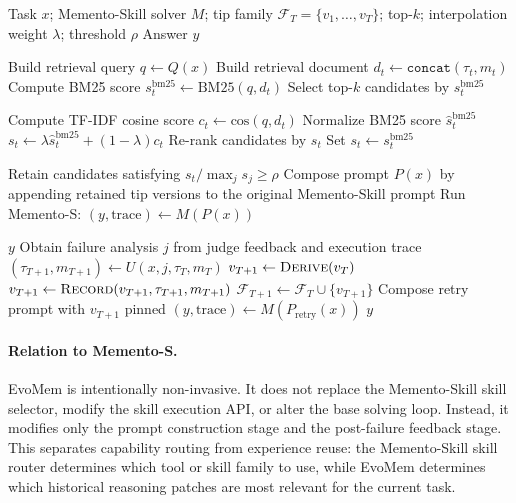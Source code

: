 \documentclass{article}
\begin{document}
\begin{algorithm}[H]
\caption{EvoMem: Versioned Tip Patching on Top of Memento-S}
\label{alg:evomem_memento}
\begin{algorithmic}[1]
\Require Task $x$; Memento-Skill solver $M$; tip family $\mathcal{F}_T=\{v_1,\ldots,v_T\}$; top-$k$; interpolation weight $\lambda$; threshold $\rho$
\Ensure Answer $y$

\State Build retrieval query $q \leftarrow Q(x)$
    \State Build retrieval document $d_t \leftarrow \texttt{concat}(\tau_t,m_t)$
    \State Compute BM25 score $s_t^{\mathrm{bm25}} \leftarrow \mathrm{BM25}(q,d_t)$
\EndFor
\State Select top-$k$ candidates by $s_t^{\mathrm{bm25}}$

        \State Compute TF-IDF cosine score $c_t \leftarrow \mathrm{cos}(q,d_t)$
        \State Normalize BM25 score $\hat{s}_t^{\mathrm{bm25}}$
        \State $s_t \leftarrow \lambda \hat{s}_t^{\mathrm{bm25}} + (1-\lambda)c_t$
    \EndFor
    \State Re-rank candidates by $s_t$
\Else
    \State Set $s_t \leftarrow s_t^{\mathrm{bm25}}$
\EndIf

\State Retain candidates satisfying $s_t/\max_j s_j \ge \rho$
\State Compose prompt $P(x)$ by appending retained tip versions to the original Memento-Skill prompt
\State Run Memento-S: $(y,\mathrm{trace}) \leftarrow M(P(x))$

    \State \Return $y$
\Else
    \State Obtain failure analysis $j$ from judge feedback and execution trace
    \State $(\tau_{T+1},m_{T+1}) \leftarrow U(x,j,\tau_T,m_T)$
    \State $v_{T+1} \leftarrow \textsc{Derive}(v_T)$
    \State $v_{T+1} \leftarrow \textsc{Record}(v_{T+1},\tau_{T+1},m_{T+1})$
    \State $\mathcal{F}_{T+1} \leftarrow \mathcal{F}_T \cup \{v_{T+1}\}$
        \State Compose retry prompt with $v_{T+1}$ pinned
        \State $(y,\mathrm{trace}) \leftarrow M(P_{\mathrm{retry}}(x))$
    \EndIf
    \State \Return $y$
\EndIf
\end{algorithmic}
\end{algorithm}

\paragraph{Relation to Memento-S.}
EvoMem is intentionally non-invasive. It does not replace the Memento-Skill skill selector, modify the skill execution API, or alter the base solving loop. Instead, it modifies only the prompt construction stage and the post-failure feedback stage. This separates capability routing from experience reuse: the Memento-Skill skill router determines which tool or skill family to use, while EvoMem determines which historical reasoning patches are most relevant for the current task.
\end{document}
